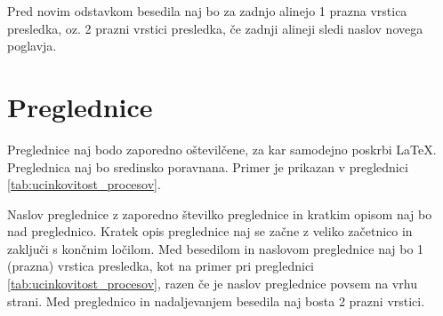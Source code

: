 Pred novim odstavkom besedila naj bo za zadnjo alinejo 1 prazna vrstica presledka, oz. 2 prazni vrstici presledka, če zadnji alineji sledi naslov novega poglavja.

\section{Preglednice}\label{sec:preglednice}

Preglednice naj bodo zaporedno oštevilčene, za kar samodejno poskrbi \LaTeX. Preglednica naj bo sredinsko poravnana. Primer je prikazan v preglednici \ref{tab:ucinkovitost_procesov}.

Naslov preglednice z zaporedno številko preglednice in kratkim opisom naj bo nad preglednico. Kratek opis preglednice naj se začne z veliko začetnico in zaključi s končnim ločilom. Med besedilom in naslovom preglednice naj bo 1 (prazna) vrstica presledka, kot na primer pri preglednici \ref{tab:ucinkovitost_procesov}, razen če je naslov preglednice povsem na vrhu strani. Med preglednico in nadaljevanjem besedila naj bosta 2 prazni vrstici.

